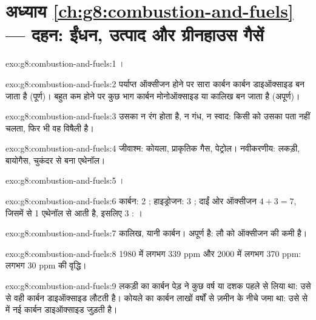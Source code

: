 \section*{अध्याय \ref{ch:g8:combustion-and-fuels} --- दहन: ईंधन, उत्पाद और ग्रीनहाउस गैसें}

\begin{solution}{exo:g8:combustion-and-fuels:1}
।
\end{solution}

\begin{solution}{exo:g8:combustion-and-fuels:2}
पर्याप्त ऑक्सीजन होने पर सारा कार्बन कार्बन डाइऑक्साइड बन जाता है (पूर्ण)।
बहुत कम होने पर कुछ भाग कार्बन मोनोऑक्साइड या कालिख बन जाता है (अपूर्ण)।
\end{solution}

\begin{solution}{exo:g8:combustion-and-fuels:3}
उसका न रंग होता है, न गंध, न स्वाद: किसी को उसका पता नहीं चलता, फिर भी वह
विषैली है।
\end{solution}

\begin{solution}{exo:g8:combustion-and-fuels:4}
जीवाश्म: कोयला, प्राकृतिक गैस, पेट्रोल। नवीकरणीय: लकड़ी, बायोगैस, चुकंदर से
बना एथेनॉल।
\end{solution}

\begin{solution}{exo:g8:combustion-and-fuels:5}
।
\end{solution}

\begin{solution}{exo:g8:combustion-and-fuels:6}
कार्बन: 2 ; हाइड्रोजन: 3 ; दाईं ओर ऑक्सीजन $4 + 3 =
7$, जिसमें से 1 एथेनॉल से आती है, इसलिए 3 :
।
\end{solution}

\begin{solution}{exo:g8:combustion-and-fuels:7}
कालिख, यानी कार्बन।  अपूर्ण है: लौ को ऑक्सीजन की कमी
है।
\end{solution}

\begin{solution}{exo:g8:combustion-and-fuels:8}
1980 में लगभग 339 ppm और 2000 में लगभग 370 ppm: लगभग 30 ppm की वृद्धि।
\end{solution}

\begin{solution}{exo:g8:combustion-and-fuels:9}
लकड़ी का कार्बन पेड़ ने कुछ वर्ष या दशक पहले  से लिया था: उसे  से
वही कार्बन डाइऑक्साइड लौटती है। कोयले का कार्बन लाखों वर्षों से ज़मीन के
नीचे जमा था: उसे  से  में नई कार्बन डाइऑक्साइड
जुड़ती है।
\end{solution}

